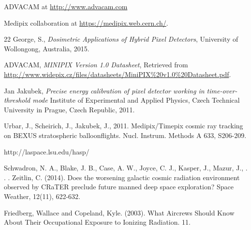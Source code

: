 \begin{thebibliography}{00}
  ADVACAM at \url{http://www.advacam.com}

  Medipix collaboration at \url{https://medipix.web.cern.ch/}.
  
 22
  George, S., \textit{Dosimetric Applications of Hybrid Pixel Detectors}, University of Wollongong, Australia, 2015.

  ADVACAM, \textit{MINIPIX Version 1.0 Datasheet}, Retrieved from \url{http://www.widepix.cz/files/datasheets/MiniPIX\%20v1.0\%20Datasheet.pdf}.

  Jan Jakubek, \textit{Precise energy calibration of pixel detector working in time-over-threshold mode} Institute of Experimental and Applied Physics, Czech Technical University in Prague, Czech Republic, 2011.

Urbar, J., Scheirich, J., Jakubek, J., 2011. Medipix/Timepix cosmic ray tracking on BEXUS stratospheric balloonflights. Nucl. Instrum. Methods A 633, S206-209.
  
http://laspace.lsu.edu/hasp/

Schwadron, N. A., Blake, J. B., Case, A. W., Joyce, C. J., Kasper, J., Mazur, J., . . . Zeitlin, C. (2014). Does the worsening galactic cosmic radiation environment observed by CRaTER preclude future manned deep space exploration? Space Weather, 12(11), 622-632. 

Friedberg, Wallace and Copeland, Kyle. (2003). What Aircrews Should Know About Their Occupational Exposure to Ionizing Radiation. 11.

\end{thebibliography}
